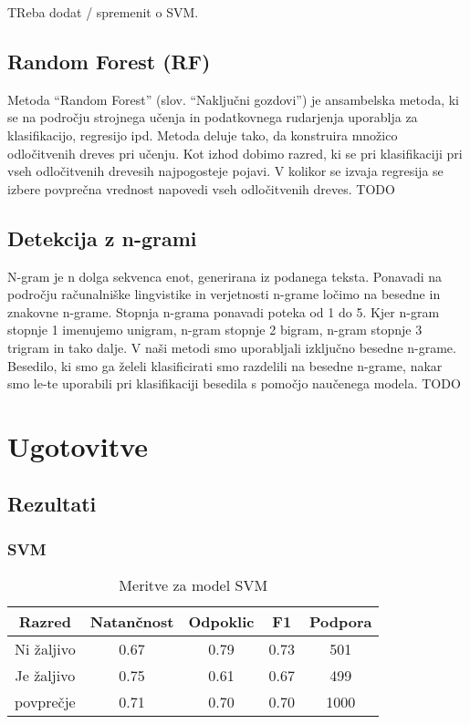 \documentclass{acm_proc_article-sp}
\begin{document}
TReba dodat / spremenit o SVM.

\subsection{Random Forest (RF)}
Metoda “Random Forest” (slov. “Naključni gozdovi”) je ansambelska metoda, ki se na področju strojnega učenja in podatkovnega rudarjenja uporablja za klasifikacijo, regresijo ipd. Metoda deluje tako, da konstruira množico odločitvenih dreves pri učenju. Kot izhod dobimo razred, ki se pri klasifikaciji pri vseh odločitvenih drevesih najpogosteje pojavi. V kolikor se izvaja regresija se izbere povprečna vrednost napovedi vseh odločitvenih dreves. TODO

\subsection{Detekcija z n-grami}
N-gram je n dolga sekvenca enot, generirana iz podanega teksta.
Ponavadi na področju računalniške lingvistike in verjetnosti n-grame ločimo na besedne in znakovne n-grame. Stopnja n-grama ponavadi poteka od 1 do 5. Kjer n-gram stopnje 1 imenujemo unigram, n-gram stopnje 2 bigram, n-gram stopnje 3 trigram in tako dalje. 
V naši metodi smo uporabljali izključno besedne n-grame. 
Besedilo, ki smo ga želeli klasificirati smo razdelili na besedne n-grame, nakar smo le-te uporabili pri klasifikaciji besedila s pomočjo naučenega modela. TODO

\section{Ugotovitve}
\subsection{Rezultati}
\subsubsection{SVM}
\begin{table}[h!]
	\centering
	\caption{Meritve za model SVM}
	\begin{tabular}{|c|c|c|c|c|}
		\hline
		\textbf{Razred} & \textbf{Natančnost} & \textbf{Odpoklic} & \textbf{F1} & \textbf{Podpora} \\ \hline
		Ni žaljivo & 0.67 & 0.79 & 0.73 & 501 \\ \hline
		Je žaljivo & 0.75 & 0.61 & 0.67 & 499 \\ \hline \hline
		povprečje & 0.71 & 0.70 & 0.70 & 1000 \\ \hline
	\end{tabular}
\end{table}
\end{document}
